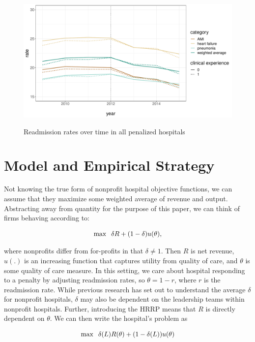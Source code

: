 \documentclass[12pt]{article}
\begin{document}
    \begin{figure}[ht!]
        \caption{Readmission rates over time in all penalized hospitals}
        \includegraphics[scale=.55]{Objects/weighted_read_graph.pdf}
        \label{fig:weighted_read_mort_graph}
    \end{figure}

    \section{Model and Empirical Strategy}

    Not knowing the true form of nonprofit hospital objective functions, we can assume that they maximize some weighted average of revenue and output. Abstracting away from quantity for the purpose of this paper, we can think of firms behaving according to:     
    
    $$\max\hspace{2mm} \delta R + (1-\delta) u(\theta),$$

    \noindent where nonprofits differ from for-profits in that $\delta\neq 1$. Then $R$ is net revenue, $u(.)$ is an increasing function that captures utility from quality of care, and $\theta$ is some quality of care measure. In this setting, we care about hospital responding to a penalty by adjusting readmission rates, so $\theta = 1-r$, where $r$ is the readmission rate. While previous research has set out to understand the average $\delta$ for nonprofit hospitals, $\delta$ may also be dependent on the leadership teams within nonprofit hospitals. Further, introducing the HRRP means that $R$ is directly dependent on $\theta$. We can then write the hospital's problem as 

    $$\max\hspace{2mm} \delta(L) R(\theta) + (1-\delta(L)) u(\theta)$$
\end{document}
